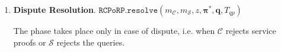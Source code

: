 \begin{enumerate}
 
  


\



\item \textbf{Dispute Resolution}. \label{RCPoRP::Dispute-Resolution} $\mathtt{RCPoRP}. \mathtt{resolve}(m_{\scriptscriptstyle \mathcal{C}},m_{\scriptscriptstyle \mathcal{S}}, z, {\bm{\pi}}^{\scriptscriptstyle *}, {\bm{q}},  T_{\scriptscriptstyle qp})$



The phase takes place only in  case of dispute, i.e. when $\mathcal C$ rejects service proofs or $\mathcal S$ rejects the queries. %

\begin{enumerate}




 
 


\end{enumerate}
\end{enumerate}
